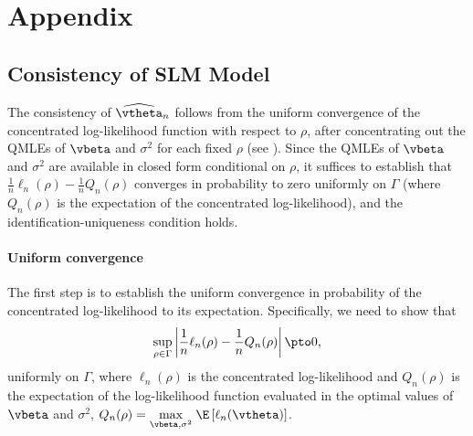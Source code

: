 \documentclass[english,12pt]{book}\usepackage[]{graphicx}\usepackage[]{xcolor}
\begin{document}
\section*{Appendix}
\begin{subappendices}

 \section{Consistency of SLM Model}\label{appendix-consistency}

The consistency of $\widehat{\vtheta}_n$ follows from the uniform convergence of the concentrated log-likelihood function with respect to $\rho$, after concentrating out the QMLEs of $\vbeta$ and $\sigma^2$ for each fixed $\rho$ (see \cite{lee2004asymptotic}). Since the QMLEs of $\vbeta$ and $\sigma^2$ are available in closed form conditional on $\rho$, it suffices to establish that $\frac{1}{n}\ell_n(\rho) - \frac{1}{n}Q_n(\rho)$ converges in probability to zero uniformly on $\Gamma$ (where $Q_n(\rho)$ is the expectation of the concentrated log-likelihood), and the identification-uniqueness condition holds. 

\paragraph{Uniform convergence}

The first step is to establish the uniform convergence in probability of the concentrated log-likelihood to its expectation. Specifically, we need to show that
\begin{equation*}
  \sup_{\rho\in\Gamma}\left|\frac{1}{n}\ell_n(\rho) - \frac{1}{n}Q_n(\rho)\right| \pto 0,
\end{equation*}
%
uniformly on $\Gamma$, where $\ell_n(\rho)$ is the concentrated log-likelihood and $Q_n(\rho)$ is the expectation of the log-likelihood function evaluated in the optimal values of $\vbeta$ and $\sigma^2$, $Q_n(\rho) = \underset{\vbeta, \sigma^2}{\max}\; \E\left[\ell_n(\vtheta)\right]$.


\end{subappendices}
\end{document}
